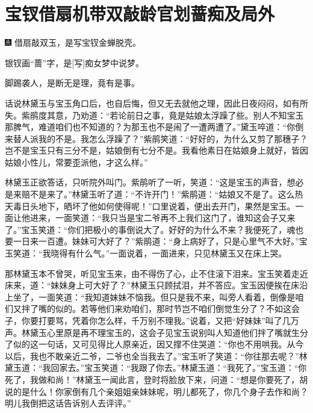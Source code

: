 

\chapter{宝钗借扇机带双敲\hspace{.5em}龄官划蔷痴及局外}

{\includegraphics[width=3mm]{../Images/00004} \kaishu 借扇敲双玉，是写宝钗金蝉脱壳。}

{银钗画``蔷''字，是{[}写{]}痴女梦中说梦。}

{脚踢袭人，是断无是理，竟有是事。}

话说林黛玉与宝玉角口后，也自后悔，但又无去就他之理，因此日夜闷闷，如有所失。紫鹃度其意，乃劝道：``若论前日之事，竟是姑娘太浮躁了些。别人不知宝玉那脾气，难道咱们也不知道的？为那玉也不是闹了一遭两遭了。''黛玉啐道：``你倒来替人派我的不是。我怎么浮躁了？''紫鹃笑道：``好好的，为什么又剪了那穗子？岂不是宝玉只有三分不是，姑娘倒有七分不是。我看他素日在姑娘身上就好，皆因姑娘小性儿，常要歪派他，才这么样。''

林黛玉正欲答话，只听院外叫门。紫鹃听了一听，笑道：``这是宝玉的声音，想必是来赔不是来了。''林黛玉听了道：``不许开门！''紫鹃道：``姑娘又不是了。这么热天毒日头地下，晒坏了他如何使得呢！''口里说着，便出去开门，果然是宝玉。一面让他进来，一面笑道：``我只当是宝二爷再不上我们这门了，谁知这会子又来了。''宝玉笑道：``你们把极小的事倒说大了。好好的为什么不来？我便死了，魂也要一日来一百遭。妹妹可大好了？''紫鹃道：``身上病好了，只是心里气不大好。''宝玉笑道：``我晓得有什么气。''一面说着，一面进来，只见林黛玉又在床上哭。

那林黛玉本不曾哭，听见宝玉来，由不得伤了心，止不住滚下泪来。宝玉笑着走近床来，道：``妹妹身上可大好了？''林黛玉只顾拭泪，并不答应。宝玉因便挨在床沿上坐了，一面笑道：``我知道妹妹不恼我。但只是我不来，叫旁人看着，倒像是咱们又拌了嘴的似的。若等他们来劝咱们，那时节岂不咱们倒觉生分了？不如这会子，你要打要骂，凭着你怎么样，千万别不理我。''说着，又把``好妹妹''叫了几万声。林黛玉心里原是再不理宝玉的，这会子见宝玉说别叫人知道他们拌了嘴就生分了似的这一句话，又可见得比人原亲近，因又撑不住哭道：``你也不用哄我。从今以后，我也不敢亲近二爷，二爷也全当我去了。''宝玉听了笑道：``你往那去呢？''林黛玉道：``我回家去。''宝玉笑道：``我跟了你去。''林黛玉道：``我死了。''宝玉道：``你死了，我做和尚！''林黛玉一闻此言，登时将脸放下来，问道：``想是你要死了，胡说的是什么！你家倒有几个亲姐姐亲妹妹呢，明儿都死了，你几个身子去作和尚？明儿我倒把这话告诉别人去评评。''

